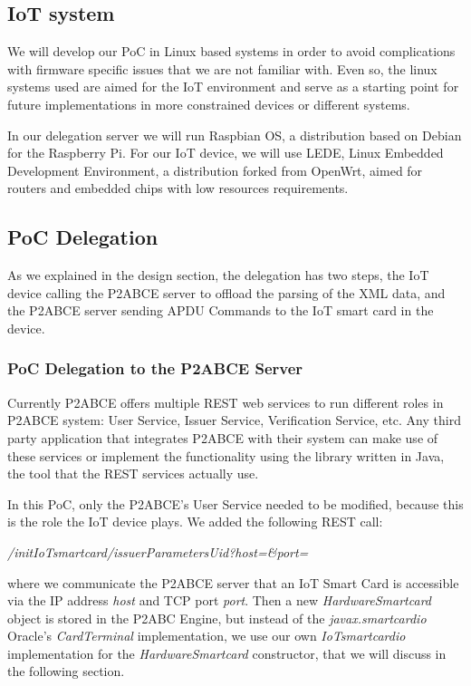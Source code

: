 \documentclass[journal]{IEEEtran}
\begin{document}
\subsection{IoT system}

We will develop our PoC in Linux based systems in order to avoid complications with firmware specific issues that we are not familiar with. Even so, the linux systems used are aimed for the IoT environment and serve as a starting point for future implementations in more constrained devices or different systems.

In our delegation server we will run Raspbian OS, a distribution based on Debian for the Raspberry Pi. For our IoT device, we will use LEDE, Linux Embedded Development Environment, a distribution forked from OpenWrt, aimed for routers and embedded chips with low resources requirements.



\subsection{PoC Delegation}

As we explained in the design section, the delegation has two steps, the IoT device calling the P2ABCE server to offload the parsing of the XML data, and the P2ABCE server sending APDU Commands to the IoT smart card in the device.


\subsubsection{PoC Delegation to the P2ABCE Server}


Currently P2ABCE offers multiple REST web services to run different roles in P2ABCE system: User Service, Issuer Service, Verification Service, etc. Any third party application that integrates P2ABCE with their system can make use of these services or implement the functionality using the library written in Java, the tool that the REST services actually use.

In this PoC, only the P2ABCE's User Service needed to be modified, because this is the role the IoT device plays. We added the following REST call:
\begin{center}
	\textit{/initIoTsmartcard/{issuerParametersUid}?host=\&port=}
\end{center}
where we communicate the P2ABCE server that an IoT Smart Card is accessible via the IP address \textit{host} and TCP port \textit{port}. Then a new \textit{HardwareSmartcard} object is stored in the P2ABC Engine, but instead of the \textit{javax.smartcardio} Oracle's \textit{CardTerminal} implementation, we use our own \textit{IoTsmartcardio} implementation for the \textit{HardwareSmartcard} constructor, that we will discuss in the following section.
\end{document}
